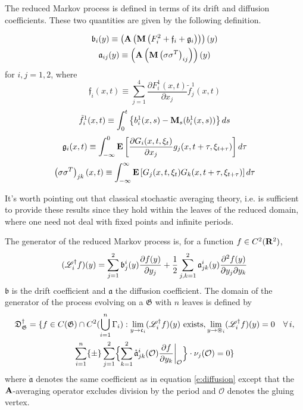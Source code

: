 The reduced Markov process is defined in terms of its drift and diffusion coefficients. These two quantities are given by the following definition.
\begin{definition}
\begin{gather}
\mathfrak{b}_i(y) \equiv \left(\operatorname{\mathbf A} \left(\operatorname{\mathbf M} \left(F_i^2 + \mathfrak{f}_i + \mathfrak{g}_i\right)\right)\right)(y)\label{e:drift}\\
\mathfrak a_{ij}(y) \equiv \left(\operatorname{\mathbf A} \left(\operatorname{\mathbf M} \left(\sigma\sigma^T\right)_{ij}\right)\right)(y)\label{e:diffusion}
\end{gather}
for $i,j = 1,2$, where
\[
\mathfrak f_i(x,t) \equiv \sum_{j=1}^4 \frac{\partial F_i^1(x,t)}{\partial x_j} \tilde f_j^1(x,t)
\]
\[
\tilde f_i^1 (x,t) \equiv \int_0^t \left\{b_i^1 (x,s) - \operatorname{\mathbf M}_s (b_i^1(x,s)) \right\} ds\\
\]
\[
\mathfrak g_i(x,t) \equiv \int_{-\infty}^0 \operatorname{\mathbf E} \left[ \frac{\partial G_i (x,t,\xi_t)}{\partial x_j} g_j(x,t+\tau,\xi_{t+\tau}) \right] d\tau
\]
\[
\left(\sigma\sigma^T\right)_{jk}(x,t) \equiv \int_{-\infty}^\infty
\operatorname{\mathbf E} \left[G_j(x,t,\xi_t) G_k (x, t + \tau, \xi_{t+\tau}) \right] d\tau
\]
\end{definition}
It's worth pointing out that classical stochastic averaging theory, i.e. \citet{khas'minskii68:_ito} is sufficient to provide these results since they hold within the leaves of the reduced domain, where one need not deal with fixed points and infinite periods.

\begin{definition}
\label{d:reduced generator}
The generator of the reduced Markov process is, for a function $f \in
C^2(\mathbf R^2)$,
\[
(\mathscr L_i^\dagger f)(y) = \sum_{j=1}^2
\mathfrak{b}^i_j(y) \frac{\partial f(y)}{\partial y_j} +
\frac12 \sum_{j,k = 1}^2 \mathfrak{a}^i_{jk}(y)
\frac{\partial^2 f(y)}{\partial y_j \partial y_k}
\]
$\mathfrak{b}$ is the drift coefficient and $\mathfrak{a}$ the diffusion coefficient. The domain of the generator of the process evolving on a $\mathfrak{G}$ with $n$ leaves is defined by
\begin{multline}
\mathfrak{D}_\mathfrak{G}^\dagger = \{f \in C(\mathfrak{G}) \cap
C^2(\bigcup_{i=1}^n \Gamma_i): \lim_{y \to \mathfrak c_i} (\mathscr L^\dagger_i f)(y) \text{ exists}, \lim_{y \to \circledast_i} (\mathscr L^\dagger_i f)(y) = 0 \quad \forall\, i,\\
\sum_{i=1}^n \{\pm\} \sum_{j=1}^2 \Bigl\{\sum_{k=1}^2
\mathring{\mathfrak a}^i_{jk}(\mathcal{O}) \frac{\partial f}{\partial
y_k}\bigg|_\mathcal{O} \Bigr\} \cdot \nu_j(\mathcal O) =0 \}
\label{e:generator domain}
\end{multline}
where $\mathring{\mathfrak{a}}$ denotes the same coefficient as in equation \eqref{e:diffusion} except that the $\operatorname{\mathbf A}$-averaging operator excludes division by the period and $\mathcal O$ denotes the gluing vertex.
\end{definition}

